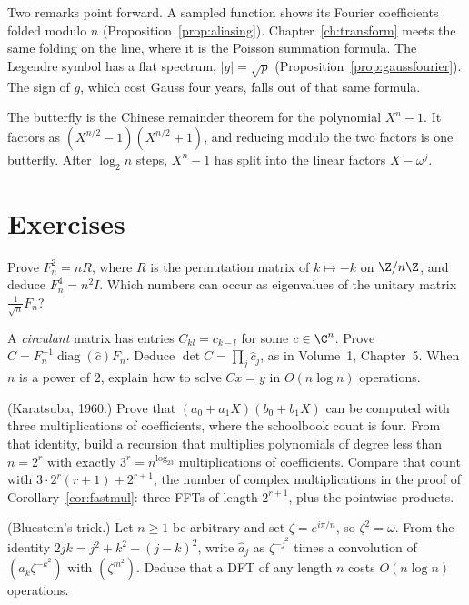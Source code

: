 Two remarks point forward. A sampled function shows its Fourier coefficients folded modulo $n$ (Proposition~\ref{prop:aliasing}). Chapter~\ref{ch:transform} meets the same folding on the line, where it is the Poisson summation formula. The Legendre symbol has a flat spectrum, $|g|=\sqrt p$ (Proposition~\ref{prop:gaussfourier}). The sign of $g$, which cost Gauss four years, falls out of that same formula.

\begin{beauty}
The butterfly is the Chinese remainder theorem for the polynomial $X^n-1$. It factors as $(X^{n/2}-1)(X^{n/2}+1)$, and reducing modulo the two factors is one butterfly. After $\log_2 n$ steps, $X^n-1$ has split into the linear factors $X-\omega^j$.
\end{beauty}

\section{Exercises}

\begin{exercise}[$\star$]\label{ex:dftorder}
Prove $F_n^2=nR$, where $R$ is the permutation matrix of $k\mapsto-k$ on $\Z/n\Z$, and deduce $F_n^4=n^2I$. Which numbers can occur as eigenvalues of the unitary matrix $\frac1{\sqrt n}F_n$?
\end{exercise}

\begin{exercise}[$\star\star$]\label{ex:circulantfft}
A \emph{circulant} matrix has entries $C_{kl}=c_{k-l}$ for some $c\in\C^n$. Prove $C=F_n^{-1}\operatorname{diag}(\hat c)F_n$. Deduce $\det C=\prod_j\hat c_j$, as in Volume~1, Chapter~5. When $n$ is a power of $2$, explain how to solve $Cx=y$ in $O(n\log n)$ operations.
\end{exercise}

\begin{exercise}[$\star\star$]\label{ex:karatsuba}
(Karatsuba, 1960.) Prove that $(a_0+a_1X)(b_0+b_1X)$ can be computed with three multiplications of coefficients, where the schoolbook count is four. From that identity, build a recursion that multiplies polynomials of degree less than $n=2^r$ with exactly $3^r=n^{\log_23}$ multiplications of coefficients. Compare that count with $3\cdot2^r(r+1)+2^{r+1}$, the number of complex multiplications in the proof of Corollary~\ref{cor:fastmul}: three FFTs of length $2^{r+1}$, plus the pointwise products.
\end{exercise}

\begin{exercise}[$\star\star$]\label{ex:bluestein}
(Bluestein's trick.) Let $n\ge1$ be arbitrary and set $\zeta=e^{i\pi/n}$, so $\zeta^2=\omega$. From the identity $2jk=j^2+k^2-(j-k)^2$, write $\hat a_j$ as $\zeta^{-j^2}$ times a convolution of $(a_k\zeta^{-k^2})$ with $(\zeta^{m^2})$. Deduce that a DFT of any length $n$ costs $O(n\log n)$ operations.
\end{exercise}

